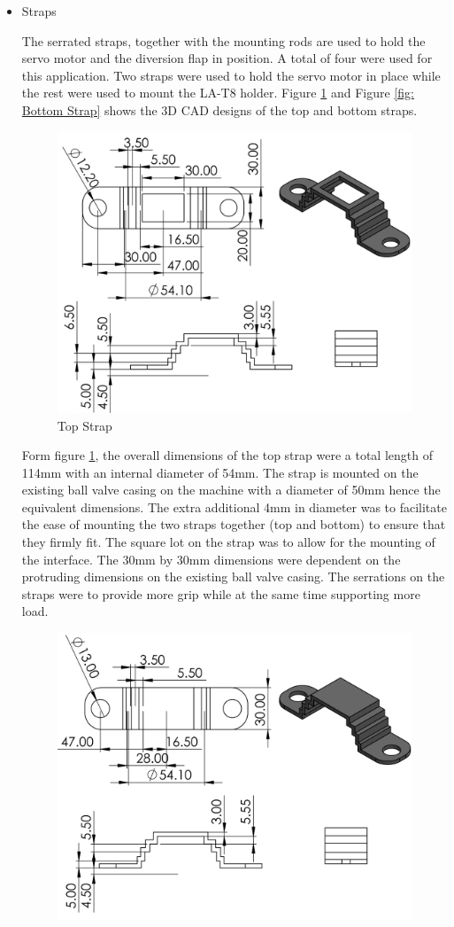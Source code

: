 \begin{itemize}
     \item Straps
    \par
The serrated straps, together with the mounting rods are used to hold the servo motor and the diversion flap in position. A total of four were used for this application. Two straps were used to hold the servo motor in place while the rest were used to mount the LA-T8 holder. Figure \ref{fig: Top Strap} and Figure \ref{fig: Bottom Strap} shows the 3D CAD designs of the top and bottom straps.
\begin{figure}[H]
        \centering
        \includegraphics [width=.8\textwidth] {Figures/twoRailStrapsTop.jpg}
        \caption{Top Strap}
        \label{fig: Top Strap}
        \end{figure}
Form figure \ref{fig: Top Strap}, the overall dimensions of the top strap were a total length of 114mm with an internal diameter of 54mm. The strap is mounted on the existing ball valve casing on the machine with a diameter of 50mm hence the equivalent dimensions. The extra additional 4mm in diameter was to facilitate the ease of mounting the two straps together (top and bottom) to ensure that they firmly fit. The square lot on the strap was to allow for the mounting of the interface. The 30mm by 30mm dimensions were dependent on the protruding dimensions on the existing ball valve casing. The serrations on the straps were to provide more grip while at the same time supporting more load. 
\begin{figure}[H]
        \centering
        \includegraphics [width=.8\textwidth] {Figures/twoRailStrapsBottom.PNG}

\end{figure}
\end{itemize}
